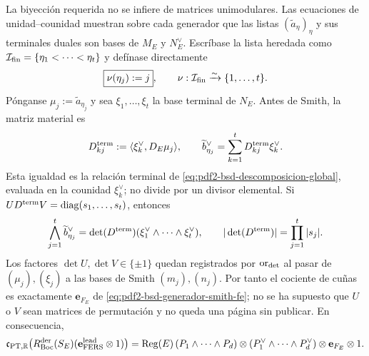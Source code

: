 \begin{proposition}
La biyección requerida no se infiere de matrices unimodulares. Las
ecuaciones de unidad--counidad muestran sobre cada generador que las listas
$(\widetilde a_\eta)_\eta$ y sus terminales duales son bases de $M_E$ y
$N_E^\vee$. Escríbase la lista heredada como
$\mathcal I_{\rm fin}=\{\eta_1<\cdots<\eta_t\}$ y defínase directamente
\begin{equation}\label{eq:pdf2-bsd-nu-construida}
 \boxed{\nu(\eta_j):=j},
 \qquad
 \nu:\mathcal I_{\rm fin}\xrightarrow{\sim}\{1,\ldots,t\}.
\end{equation}
Pónganse $\mu_j:=\widetilde a_{\eta_j}$ y sea
$\xi_1,\ldots,\xi_t$ la base terminal de $N_E$. Antes de Smith, la matriz
material es
\begin{equation}\label{eq:pdf2-bsd-c2-filas-finitas}
 D^{\rm term}_{kj}:=
 \langle\xi_k^\vee,D_E\mu_j\rangle,
 \qquad
 \widetilde b_{\eta_j}^\vee
 =\sum_{k=1}^tD^{\rm term}_{kj}\xi_k^\vee.
\end{equation}
Esta igualdad es la relación terminal de
\eqref{eq:pdf2-bsd-descomposicion-global}, evaluada en la counidad
$\xi_k^\vee$; no divide por un divisor elemental. Si
$UD^{\rm term}V=\operatorname{diag}(s_1,\ldots,s_t)$, entonces
\begin{equation}\label{eq:pdf2-bsd-cuna-smith-con-uv}
 \bigwedge_{j=1}^t\widetilde b_{\eta_j}^\vee
 =\det(D^{\rm term})
   (\xi_1^\vee\wedge\cdots\wedge\xi_t^\vee),
 \qquad
 |\det(D^{\rm term})|=\prod_{j=1}^t|s_j|.
\end{equation}
Los factores $\det U,\det V\in\{\pm1\}$ quedan registrados por
$\operatorname{or}_{\rm det}$ al pasar de $(\mu_j),(\xi_j)$ a las bases de
Smith $(m_j),(n_j)$. Por tanto el cociente de cuñas es exactamente
$\mathbf e_{F_E}$ de \eqref{eq:pdf2-bsd-generador-smith-fe}; no se ha
supuesto que $U$ o $V$ sean matrices de permutación y no queda una página
sin publicar. En
consecuencia,
\begin{equation}\label{eq:pdf2-bsd-c2-generadores}
 \mathfrak c_{{\rm PT},\mathbb R}
 \bigl(R_{\rm Boc}^{\rm der}(S_E)
       (\mathbf e_{\rm FERS}^{\rm lead}\otimes1)\bigr)
 =\operatorname{Reg}(E)\,
  (P_1\wedge\cdots\wedge P_d)\otimes
  (P_1^\vee\wedge\cdots\wedge P_d^\vee)
  \otimes\mathbf e_{F_E}\otimes1.
\end{equation}


\end{proposition}

